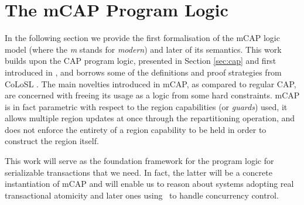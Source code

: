 \section{The mCAP Program Logic}

\label{sec:mcapModel}

In the following section we provide the first formalisation of the mCAP logic model (where the \textit{m} stands for \textit{modern}) and later of its semantics. This work builds upon the CAP program logic, presented in Section \ref{sec:cap} and first introduced in \cite{cap}, and borrows some of the definitions and proof strategies from CoLoSL \cite{colosl}. The main novelties introduced in mCAP, as compared to regular CAP, are concerned with freeing its usage as a logic from some hard constraints. mCAP is in fact parametric with respect to the region capabilities (or \textit{guards}) used, it allows multiple region updates at once through the repartitioning operation, and does not enforce the entirety of a region capability to be held in order to construct the region itself.

This work will serve as the foundation framework for the program logic for serializable transactions that we need. In fact, the latter will be a concrete instantiation of mCAP and will enable us to reason about systems adopting real transactional atomicity and later ones using \tpl\ to handle concurrency control.



\newpage



\newpage

